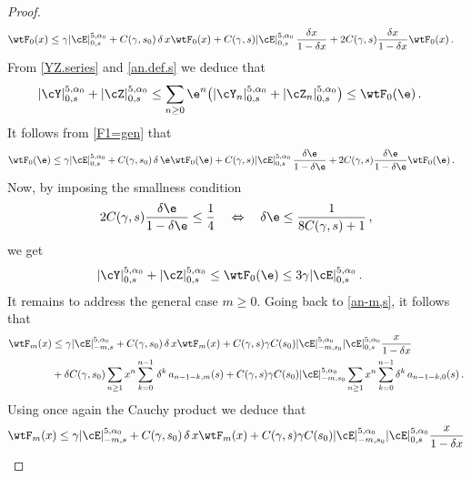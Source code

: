 \documentclass[a4paper,reqno,10pt]{article}
\begin{document}
\begin{proof}
\begin{align}
		  	 \wtF_0(x) & \leq  \gamma |\cE|_{0,s}^{5,\alpha_{0}}+ C(\gamma, s_0)\,  \delta\,  x\wtF_0(x) + C(\gamma,s)  |\cE|_{0,s}^{5,\alpha_{0}}\,   \frac{\delta x}{1-\delta x} + 2 C(\gamma,s)\frac{\delta x}{1-\delta x} \wtF_0(x)\,.
		 	\end{align}
            From \eqref{YZ.series} and \eqref{an.def.s} we deduce that
            \begin{align*}
		|\cY|_{0,s}^{5,\alpha_{0}} + |\cZ|_{0,s}^{5,\alpha_{0}} &\leq \sum_{n\geq 0}  \e^n \big( |\cY_{n}|_{0,s}^{5,\alpha_{0}} + |\cZ_{n}|_{0,s}^{5,\alpha_{0}}  \big) \leq \wtF_0(\e)\,.
	\end{align*}
    It follows from \eqref{F1=gen} that
    \begin{align}
	 	\wtF_0(\e) & \leq  \gamma |\cE|_{0,s}^{5,\alpha_{0}}+ C(\gamma, s_0)\,  \delta\,  \e \wtF_0(\e) + C(\gamma,s)  |\cE|_{0,s}^{5,\alpha_{0}}\,   \frac{\delta \e}{1-\delta \e}+  2C(\gamma,s)\frac{\delta \e}{1-\delta \e} \wtF_0(\e)\,.
		 	\end{align}
            Now, by imposing the smallness  condition
            \begin{align}\label{assum-pet}
            2C(\gamma,s)\frac{\delta \e}{1-\delta\e}\leq\frac14  \quad \Leftrightarrow \quad  {\delta \e}\leq\frac{1}{8C(\gamma,s)+1} \,,
        \end{align}
            we get
            \begin{align}\label{F1=gen1}
		  |\cY|_{0,s}^{5,\alpha_{0}} + |\cZ|_{0,s}^{5,\alpha_{0}}\le 	\wtF_0(\e) & \leq 3 \gamma |\cE|_{0,s}^{5,\alpha_{0}}\,.
		 	\end{align}
            It remains to address the general case $m\geq 0$. Going  back  to \eqref{an-m,s}, it follows that
            \begin{align*}
		 	\wtF_m(x) & \leq \gamma |\cE|_{-m,s}^{5,\alpha_{0}}+  C(\gamma, s_0)\,  \delta\,  x\wtF_m(x) + C(\gamma,s)   \gamma C(s_0) |\cE|_{-m,s_0}^{5,\alpha_{0}} |\cE|_{0,s}^{5,\alpha_{0}} \frac{x}{1-\delta x} \\
		 	\nonumber 	&  +  \delta C(\gamma,s_0)\sum_{n\geq 1}x^n\sum_{k=0}^{n-1}     \,\delta^{k} \, a_{n-1-k,m}(s) + C(\gamma,s) \gamma C(s_0)|\cE|_{-m,s_0}^{5,\alpha_{0}}\sum_{n\geq 1}x^n\sum_{k=0}^{n-1}  \delta^{k}\,a_{n-1-k,0}(s)  \,.
		 	\end{align*}
          Using once again the Cauchy product we deduce that  
             \begin{align}
		 	 \wtF_m(x) & \leq \gamma |\cE|_{-m,s}^{5,\alpha_{0}}+  C(\gamma, s_0)\,  \delta\,  x\wtF_m(x) + C(\gamma,s)  \gamma C(s_0)  |\cE|_{-m,s_0}^{5,\alpha_{0}} |\cE|_{0,s}^{5,\alpha_{0}}\frac{x}{1-\delta x} \\

\end{align}
\end{proof}
\end{document}
